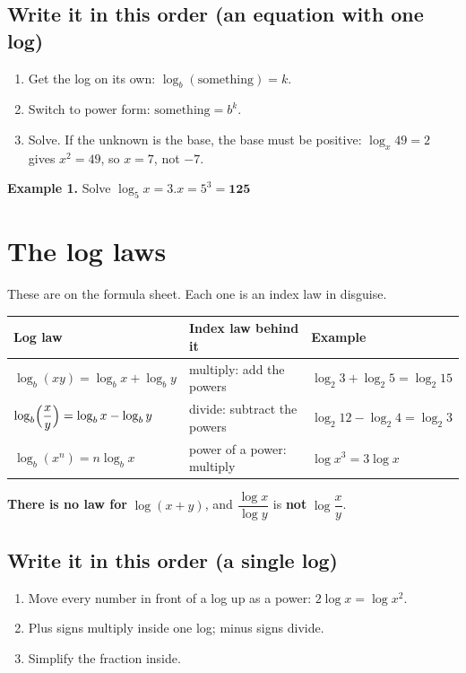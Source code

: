 \documentclass[11pt]{article}
\begin{document}
\subsection*{Write it in this order (an equation with one log)}
\begin{enumerate}
\item Get the log on its own: $\log_{b}(\text{something}) = k$.
\item Switch to power form: $\text{something} = b^{k}$.
\item Solve. If the unknown is the base, the base must be positive: $\log_{x} 49 = 2$ gives $x^{2} = 49$, so $x = 7$, not $-7$.
\end{enumerate}

\textbf{Example 1.} Solve $\log_{5} x = 3$.\quad $x = 5^{3} = \mathbf{125}$ 

\section{The log laws}\label{h2:laws}
These are on the formula sheet. Each one is an index law in disguise.
\begin{center}
\renewcommand\arraystretch{1.6}
\begin{tabular}{@{}l l l@{}}
\toprule
\textbf{Log law} & \textbf{Index law behind it} & \textbf{Example} \\ \midrule
$\log_{b}(xy) = \log_{b}x + \log_{b}y$ & multiply: add the powers & $\log_{2}3 + \log_{2}5 = \log_{2}15$ \\
$\log_{b}\Bigl(\dfrac{x}{y}\Bigr) = \log_{b}x - \log_{b}y$ & divide: subtract the powers & $\log_{2}12 - \log_{2}4 = \log_{2}3$ \\
$\log_{b}(x^{n}) = n\log_{b}x$ & power of a power: multiply & $\log x^{3} = 3\log x$ \\
\bottomrule
\end{tabular}
\end{center}
\textbf{There is no law for} $\log(x+y)$, and $\dfrac{\log x}{\log y}$ is \textbf{not} $\log\dfrac{x}{y}$.

\subsection*{Write it in this order (a single log)}
\begin{enumerate}
\item Move every number in front of a log up as a power: $2\log x = \log x^{2}$.
\item Plus signs multiply inside one log; minus signs divide.
\item Simplify the fraction inside.
\end{enumerate}
\end{document}
